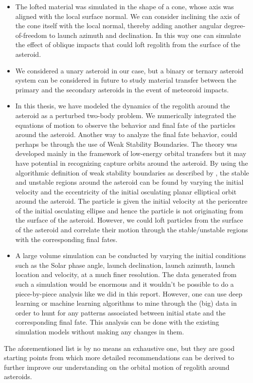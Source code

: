 \begin{itemize}
\item The lofted material was simulated in the shape of a cone, whose axis was aligned with the local surface normal. We can consider inclining the axis of the cone itself with the local normal, thereby adding another angular degree-of-freedom to launch azimuth and declination. In this way one can simulate the effect of oblique impacts that could loft regolith from the surface of the asteroid.

\item We considered a unary asteroid in our case, but a binary or ternary asteroid system can be considered in future to study material transfer between the primary and the secondary asteroids in the event of meteoroid impacts.

\item In this thesis, we have modeled the dynamics of the regolith around the asteroid as a perturbed two-body problem. We numerically integrated the equations of motion to observe the behavior and final fate of the particles around the asteroid. Another way to analyze the final fate behavior, could perhaps be through the use of Weak Stability Boundaries. The theory was developed mainly in the framework of low-energy orbital transfers but it may have potential in recognizing capture orbits around the asteroid. By using the algorithmic definition of weak stability boundaries as described by \cite{garcia2007WSB}, the stable and unstable regions around the asteroid can be found by varying the initial velocity and the eccentricity of the initial osculating planar elliptical orbit around the asteroid. The particle is given the initial velocity at the pericentre of the initial osculating ellipse and hence the particle is not originating from the surface of the asteroid. However, we could loft particles from the surface of the asteroid and correlate their motion through the stable/unstable regions with the corresponding final fates.

\item A large volume simulation can be conducted by varying the initial conditions such as the Solar phase angle, launch declination, launch azimuth, launch location and velocity, at a much finer resolution. The data generated from such a simulation would be enormous and it wouldn't be possible to do a piece-by-piece analysis like we did in this report. However, one can use deep learning or machine learning algorithms to mine through the (big) data in order to hunt for any patterns associated between initial state and the corresponding final fate. This analysis can be done with the existing simulation models without making any changes in them.
\end{itemize}

The aforementioned list is by no means an exhaustive one, but they are good starting points from which more detailed recommendations can be derived to further improve our understanding on the orbital motion of regolith around asteroids.
